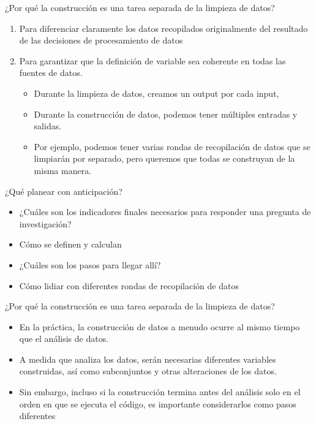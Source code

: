 \documentclass[10pt, aspectratio=169, compress]{beamer}
\begin{document}
\begin{frame}{¿Por qué la construcción es una tarea separada de la limpieza de datos?}
	\begin{enumerate}
		\item Para diferenciar claramente los datos recopilados originalmente del resultado de las decisiones de procesamiento de datos
		\item Para garantizar que la definición de variable sea coherente en todas las fuentes de datos.
		\begin{itemize}
			\item Durante la limpieza de datos, creamos un output por cada input,
			\item Durante la construcción de datos, podemos tener múltiples entradas y salidas.
			\item Por ejemplo, podemos tener varias rondas de recopilación de datos que se limpiarán por separado, pero queremos que todas se construyan de la misma manera.
		\end{itemize}
	\end{enumerate}
\end{frame}
\begin{frame}{¿Qué planear con anticipación?}
	\begin{itemize}
		\item ¿Cuáles son los indicadores finales necesarios para responder una pregunta de investigación?
		\item Cómo se definen y calculan
		\item ¿Cuáles son los pasos para llegar allí?
		\item Cómo lidiar con diferentes rondas de recopilación de datos
	\end{itemize}
\end{frame}
\begin{frame}{¿Por qué la construcción es una tarea separada de la limpieza de datos?}
	\begin{itemize}
		\item En la práctica, la construcción de datos a menudo ocurre al mismo tiempo que el análisis de datos.
		\item A medida que analiza los datos, serán necesarias diferentes variables construidas, así como subconjuntos y otras alteraciones de los datos.
		\item Sin embargo, incluso si la construcción termina antes del análisis solo en el orden en que se ejecuta el código, es importante considerarlos como pasos diferentes
	\end{itemize}
\end{frame}
\end{document}
